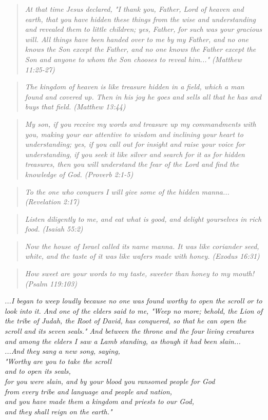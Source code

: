 \documentclass[10pt,oneside,footinclude=true,headinclude=true]{scrbook} %
\newcommand\quot[1]{
	\begin{quote}\textit{\small#1}\end{quote}
}
\newcommand\pagequot[1]{
	\newpage
	\clearscrheadfoot
	\vspace*{\stretch{2}}
	\begin{center}
	\begin{minipage}[c]{8cm}
		#1
	\end{minipage}
	\end{center}
	\vspace*{\stretch{3}}
}
\begin{document}
\quot{At that time Jesus declared, "I thank you, Father, Lord of heaven and earth, that you have hidden these things from the wise and understanding and revealed them to little children; yes, Father, for such was your gracious will. All things have been handed over to me by my Father, and no one knows the Son except the Father, and no one knows the Father except the Son and anyone to whom the Son chooses to reveal him..." (Matthew 11:25-27)}

\quot{The kingdom of heaven is like treasure hidden in a field, which a man found and covered up. Then in his joy he goes and sells all that he has and buys that field. (Matthew 13:44)}

\quot{My son, if you receive my words
    and treasure up my commandments with you,
making your ear attentive to wisdom
    and inclining your heart to understanding;
yes, if you call out for insight
    and raise your voice for understanding,
if you seek it like silver
    and search for it as for hidden treasures,
then you will understand the fear of the Lord
    and find the knowledge of God. (Proverb 2:1-5)}

\quot{To the one who conquers I will give some of the hidden manna... (Revelation 2:17)}

\quot{Listen diligently to me, and eat what is good, and delight yourselves in rich food. (Isaiah 55:2)}

\quot{Now the house of Israel called its name manna. It was like coriander seed, white, and the taste of it was like wafers made with honey. (Exodus 16:31)}

\quot{How sweet are your words to my taste, sweeter than honey to my mouth! (Psalm 119:103)}

\pagequot{
\centering
\textit{...I began to weep loudly because no one was found worthy to open the scroll or to look into it. And one of the elders said to me, "Weep no more; behold, the Lion of the tribe of Judah, the Root of David, has conquered, so that he can open the scroll and its seven seals." And between the throne and the four living creatures and among the elders I saw a Lamb standing, as though it had been slain...\\
\vspace{2mm}
...And they sang a new song, saying,\\
"Worthy are you to take the scroll\\
\hspace*{5mm}and to open its seals,\\
for you were slain, and by your blood you ransomed people for God\\
\hspace*{5mm}from every tribe and language and people and nation,\\
and you have made them a kingdom and priests to our God,\\
\hspace*{5mm}and they shall reign on the earth."}\\
\bigskip
\spacedlowsmallcaps{Revelation 5:4-6, 9-10}
}
\end{document}
